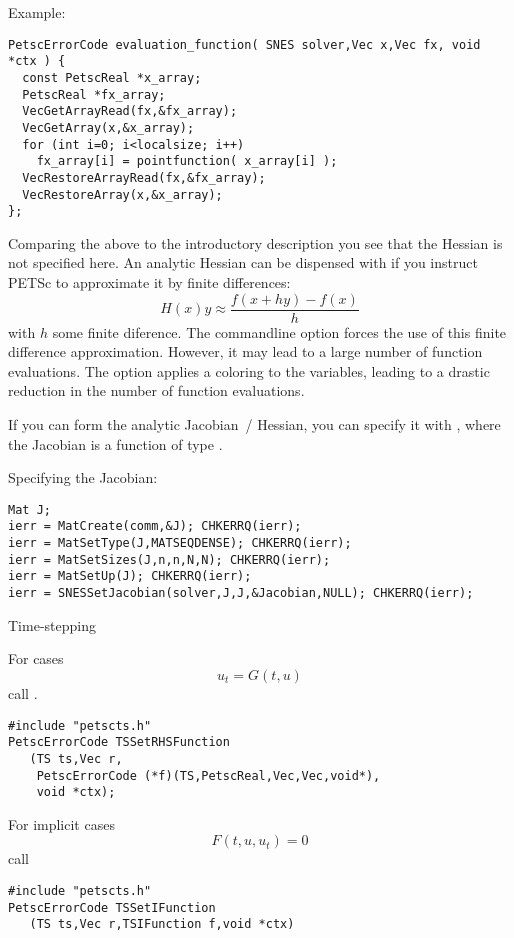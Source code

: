 Example:
\begin{lstlisting}
PetscErrorCode evaluation_function( SNES solver,Vec x,Vec fx, void *ctx ) {
  const PetscReal *x_array;
  PetscReal *fx_array;
  VecGetArrayRead(fx,&fx_array);
  VecGetArray(x,&x_array);
  for (int i=0; i<localsize; i++)
    fx_array[i] = pointfunction( x_array[i] );
  VecRestoreArrayRead(fx,&fx_array);
  VecRestoreArray(x,&x_array);
};
\end{lstlisting}

Comparing the above to the introductory description you see that
the Hessian is not specified here.
An analytic Hessian can be dispensed with if you instruct
PETSc to approximate it by finite differences:
\[ H(x)y \approx \frac{f(x+hy)-f(x)}{h} \]
with $h$ some finite diference.
The commandline option  forces
the use of this finite difference approximation.
However, it may lead to a large number of function evaluations.
The option  applies a coloring
to the variables, leading to a drastic reduction in the number
of function evaluations.

If you can form the analytic Jacobian~/ Hessian, you can specify it with
,
where the Jacobian is a function of type
.

Specifying the Jacobian:
\begin{lstlisting}
Mat J;
ierr = MatCreate(comm,&J); CHKERRQ(ierr);
ierr = MatSetType(J,MATSEQDENSE); CHKERRQ(ierr);
ierr = MatSetSizes(J,n,n,N,N); CHKERRQ(ierr);
ierr = MatSetUp(J); CHKERRQ(ierr);
ierr = SNESSetJacobian(solver,J,J,&Jacobian,NULL); CHKERRQ(ierr);
\end{lstlisting}

 {Time-stepping}

For cases
\[ u_t = G(t,u) \]
call .
\begin{lstlisting}
#include "petscts.h"  
PetscErrorCode TSSetRHSFunction
   (TS ts,Vec r,
    PetscErrorCode (*f)(TS,PetscReal,Vec,Vec,void*),
    void *ctx);
\end{lstlisting}

For implicit cases
\[ F( t,u,u_t ) = 0 \]
call 
\begin{lstlisting}
#include "petscts.h"  
PetscErrorCode TSSetIFunction
   (TS ts,Vec r,TSIFunction f,void *ctx)
\end{lstlisting}
